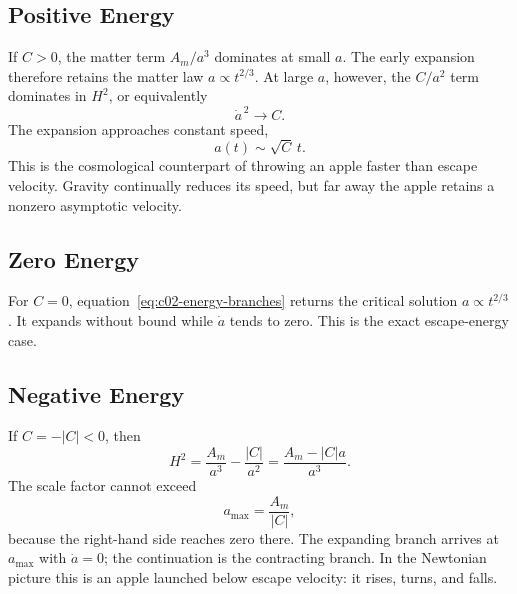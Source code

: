 \subsection{Positive Energy}

If \(C>0\), the matter term \(A_m/a^3\) dominates at small \(a\). The early expansion therefore retains the matter law \(a\propto t^{2/3}\). At large \(a\), however, the \(C/a^2\) term dominates in \(H^2\), or equivalently
\begin{equation}
\dot a^{\,2}\longrightarrow C.
\end{equation}
The expansion approaches constant speed,
\begin{equation}
a(t)\sim\sqrt C\,t.
\label{eq:c02-positive-late}
\end{equation}
This is the cosmological counterpart of throwing an apple faster than escape velocity. Gravity continually reduces its speed, but far away the apple retains a nonzero asymptotic velocity.

\subsection{Zero Energy}

For \(C=0\), equation~\eqref{eq:c02-energy-branches} returns the critical solution \(a\propto t^{2/3}\). It expands without bound while \(\dot a\) tends to zero. This is the exact escape-energy case.

\subsection{Negative Energy}

If \(C=-|C|<0\), then
\begin{equation}
H^2=\frac{A_m}{a^3}-\frac{|C|}{a^2}
=\frac{A_m-|C|a}{a^3}.
\label{eq:c02-negative-energy}
\end{equation}
The scale factor cannot exceed
\begin{equation}
a_{\max}=\frac{A_m}{|C|},
\label{eq:c02-amax}
\end{equation}
because the right-hand side reaches zero there. The expanding branch arrives at \(a_{\max}\) with \(\dot a=0\); the continuation is the contracting branch. In the Newtonian picture this is an apple launched below escape velocity: it rises, turns, and falls.

\begin{classroomqa}
\end{classroomqa}


